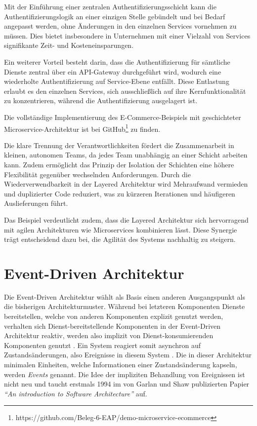 \documentclass[acmtog]{acmart}
\begin{document}
Mit der Einführung einer zentralen Authentifizierungsschicht kann die Authentifizierungslogik
an einer einzigen Stelle gebündelt und bei Bedarf angepasst werden, ohne Änderungen in den
einzelnen Services vornehmen zu müssen.
Dies bietet insbesondere in Unternehmen mit einer Vielzahl von Services signifikante Zeit- und Kosteneinsparungen.

Ein weiterer Vorteil besteht darin, dass die Authentifizierung für sämtliche Dienste
zentral über ein API-Gateway durchgeführt wird, wodurch eine wiederholte Authentifizierung
auf Service-Ebene entfällt.
Diese Entlastung erlaubt es den einzelnen Services, sich ausschließlich auf ihre
Kernfunktionalität zu konzentrieren, während die Authentifizierung ausgelagert ist.

Die vollständige Implementierung des E-Commerce-Beispiels mit geschichteter Microservice-Architektur
ist bei GitHub\footnote{https://github.com/Beleg-6-EAP/demo-microservice-ecommerce} zu finden.

Die klare Trennung der Verantwortlichkeiten fördert die Zusammenarbeit in kleinen, autonomen
Teams, da jedes Team unabhängig an einer Schicht arbeiten kann.
Zudem ermöglicht das Prinzip der Isolation der Schichten eine höhere Flexibilität gegenüber wechselnden Anforderungen.
Durch die Wiederverwendbarkeit in der Layered Architektur wird Mehraufwand vermieden und duplizierter
Code reduziert, was zu kürzeren Iterationen und häufigeren Auslieferungen führt.

Das Beispiel verdeutlicht zudem, dass die Layered Architektur sich hervorragend mit agilen
Architekturen wie Microservices kombinieren lässt.
Diese Synergie trägt entscheidend dazu bei, die Agilität des Systems nachhaltig zu steigern.

\section{Event-Driven Architektur}
\label{sec:eda}
Die Event-Driven Architektur wählt als Basis einen anderen Ausgangspunkt als die bisherigen Architekturmuster.
Während bei letzteren Komponenten Dienste bereitstellen, welche von anderen Komponenten explizit genutzt werden,
verhalten sich Dienst-bereitstellende Komponenten in der Event-Driven Architektur reaktiv,
werden also implizit von Dienst-konsumierenden Komponenten genutzt \cite{garlanShawImplizit}.
Ein System reagiert somit asynchron auf Zustandsänderungen, also Ereignisse in diesem System \cite{eda}.
Die in dieser Architektur minimalen Einheiten, welche Informationen einer Zustandsänderung kapseln, werden \textit{Events} genannt.
Die Idee der impliziten Behandlung von Ereignissen ist nicht neu und taucht erstmals 1994 im von Garlan und Shaw publizierten Papier
\textit{\enquote{An introduction to Software Architecture}} auf.
\end{document}
